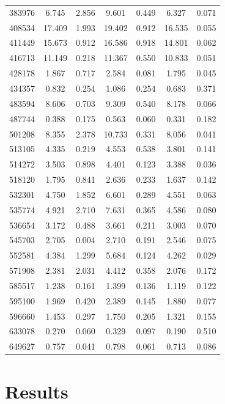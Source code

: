 \documentclass[fleqn,usenatbib]{mnras}
\begin{document}
\begin{table}
\begin{tabular}{S[table-format=6]S[table-format=2.3]S[table-format=2.3]S[table-format=3.3]S[table-format=1.3]S[table-format=2.3]S[table-format=1.3]}
383976 & 6.745 & 2.856 & 9.601 & 0.449 & 6.327 & 0.071 \\
408534 & 17.409 & 1.993 & 19.402 & 0.912 & 16.535 & 0.055 \\
411449 & 15.673 & 0.912 & 16.586 & 0.918 & 14.801 & 0.062 \\
416713 & 11.149 & 0.218 & 11.367 & 0.550 & 10.833 & 0.051 \\
428178 & 1.867 & 0.717 & 2.584 & 0.081 & 1.795 & 0.045 \\
434357 & 0.832 & 0.254 & 1.086 & 0.254 & 0.683 & 0.371 \\
483594 & 8.606 & 0.703 & 9.309 & 0.540 & 8.178 & 0.066 \\
487744 & 0.388 & 0.175 & 0.563 & 0.060 & 0.331 & 0.182 \\
501208 & 8.355 & 2.378 & 10.733 & 0.331 & 8.056 & 0.041 \\
513105 & 4.335 & 0.219 & 4.553 & 0.538 & 3.801 & 0.141 \\
514272 & 3.503 & 0.898 & 4.401 & 0.123 & 3.388 & 0.036 \\
518120 & 1.795 & 0.841 & 2.636 & 0.233 & 1.637 & 0.142 \\
532301 & 4.750 & 1.852 & 6.601 & 0.289 & 4.551 & 0.063 \\
535774 & 4.921 & 2.710 & 7.631 & 0.365 & 4.586 & 0.080 \\
536654 & 3.172 & 0.488 & 3.661 & 0.211 & 3.003 & 0.070 \\
545703 & 2.705 & 0.004 & 2.710 & 0.191 & 2.546 & 0.075 \\
552581 & 4.384 & 1.299 & 5.684 & 0.124 & 4.262 & 0.029 \\
571908 & 2.381 & 2.031 & 4.412 & 0.358 & 2.076 & 0.172 \\
585517 & 1.238 & 0.161 & 1.399 & 0.136 & 1.119 & 0.122 \\
595100 & 1.969 & 0.420 & 2.389 & 0.145 & 1.880 & 0.077 \\
596660 & 1.453 & 0.297 & 1.750 & 0.205 & 1.321 & 0.155 \\
633078 & 0.270 & 0.060 & 0.329 & 0.097 & 0.190 & 0.510 \\
649627 & 0.757 & 0.041 & 0.798 & 0.061 & 0.713 & 0.086 \\ \hline
\end{tabular}
\end{table}
%

\section{Results}\label{sec:results}
\end{document}
